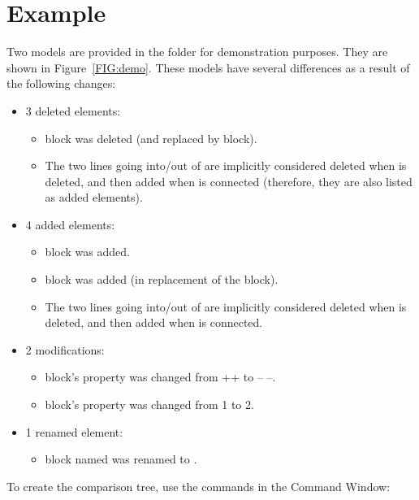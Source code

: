 \documentclass{article}
\begin{document}
\section{Example}
\label{SEC:example}
Two models are provided in the  folder for demonstration purposes. They are shown in Figure~\ref{FIG:demo}. These models have several differences as a result of the following changes:

\begin{itemize}
\item 3 deleted elements:
	\begin{itemize}
		\item {} block was deleted (and replaced by  block).
		\item The two lines going into/out of  are implicitly considered deleted when  is deleted, and then added when  is connected (therefore, they are also listed as added elements).

	\end{itemize}
\item 4 added elements:
	\begin{itemize}
		\item {} block was added.
		\item {} block was added (in replacement of the  block).
		\item The two lines going into/out of  are implicitly considered deleted when  is deleted, and then added when  is connected. 
	\end{itemize}

\item 2 modifications:
	\begin{itemize}
		\item {} block's  property was changed from ++ to -- --.
		\item {} block's  property was changed from 1 to 2.
	\end{itemize}
\item 1 renamed element:
	\begin{itemize}
		\item {} block named  was renamed to .
	\end{itemize}
\end{itemize}

\noindent
To create the comparison tree, use the commands in the Command Window:
\end{document}
